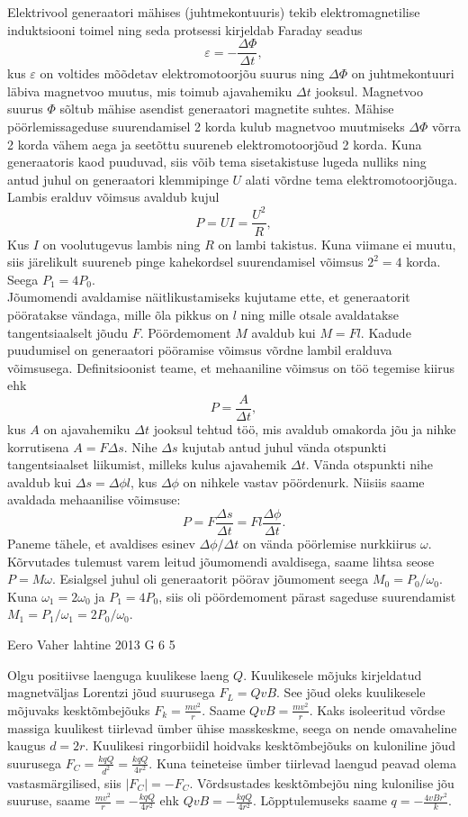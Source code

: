 \documentclass[11pt, twoside]{article}
\begin{document}
{{\ifSolution
\osa Elektrivool generaatori mähises (juhtmekontuuris) tekib elektromagnetilise induktsiooni toimel ning seda protsessi kirjeldab Faraday seadus
$$
\varepsilon = -\frac{\Delta\Phi}{\Delta t},
$$
kus $\varepsilon$ on voltides mõõdetav elektromotoorjõu suurus ning $\Delta\Phi$ on juhtmekontuuri läbiva magnetvoo muutus, mis toimub ajavahemiku $\Delta t$ jooksul. Magnetvoo suurus $\Phi$ sõltub mähise asendist generaatori magnetite suhtes. Mähise pöörlemissageduse suurendamisel 2 korda kulub magnetvoo muutmiseks $\Delta\Phi$ võrra 2 korda vähem aega  ja seetõttu suureneb elektromotoorjõud 2 korda. Kuna generaatoris kaod puuduvad, siis võib tema sisetakistuse lugeda nulliks ning antud juhul on generaatori klemmipinge $U$ alati võrdne tema elektromotoorjõuga. Lambis eralduv võimsus avaldub kujul
$$
P = UI = \frac{U^2}{R},
$$
Kus $I$ on voolutugevus lambis ning $R$ on lambi takistus. Kuna viimane ei muutu, siis järelikult suureneb pinge kahekordsel suurendamisel võimsus $2^2=4$ korda. Seega $P_1=4P_0$.\\
\osa Jõumomendi avaldamise näitlikustamiseks kujutame ette, et generaatorit pööratakse vändaga, mille õla pikkus on $l$ ning mille otsale avaldatakse tangentsiaalselt jõudu $F$. Pöördemoment $M$ avaldub kui $M=Fl$. Kadude puudumisel on generaatori pööramise võimsus võrdne lambil eralduva võimsusega. Definitsioonist teame, et mehaaniline võimsus on töö tegemise kiirus ehk
$$
P = \frac{A}{\Delta t},
$$
kus $A$ on ajavahemiku $\Delta t$ jooksul tehtud töö, mis avaldub omakorda jõu ja nihke korrutisena $A=F \Delta s$. Nihe $\Delta s$ kujutab antud juhul vända otspunkti tangentsiaalset liikumist, milleks kulus ajavahemik $\Delta t$. Vända otspunkti nihe avaldub kui $\Delta s=\Delta\phi l$, kus $\Delta\phi$ on nihkele vastav pöördenurk. Niisiis saame avaldada mehaanilise võimsuse:
$$
P = F \frac{\Delta s}{\Delta t} =Fl \frac{\Delta\phi}{\Delta t}.
$$
Paneme tähele, et avaldises esinev $\Delta\phi / \Delta t$ on vända pöörlemise nurkkiirus $\omega$. Kõrvutades tulemust varem leitud jõumomendi avaldisega, saame lihtsa seose $P=M\omega$. Esialgsel juhul oli generaatorit pöörav jõumoment seega
$M_0 = P_0/\omega_0$. Kuna $\omega_1=2\omega_0$ ja $P_1=4P_0$, siis oli pöördemoment pärast sageduse suurendamist $M_1 = P_1/\omega_1=2P_0/\omega_0$.
\fi
}

{Eero Vaher} %
{lahtine} %
{2013} %
{G 6} %
{5} %
{

\ifSolution
Olgu positiivse laenguga kuulikese laeng $Q$. Kuulikesele mõjuks kirjeldatud magnetväljas Lorentzi jõud suurusega $F_L=QvB$. See jõud oleks kuulikesele mõjuvaks kesktõmbejõuks $F_k=\frac{mv^2}{r}$. Saame $QvB=\frac{mv^2}{r}$. Kaks isoleeritud võrdse massiga kuulikest tiirlevad ümber ühise masskeskme, seega on nende omavaheline kaugus $d=2r$. Kuulikesi ringorbiidil hoidvaks kesktõmbejõuks on kuloniline jõud suurusega $F_C=\frac{kqQ}{d^2}=\frac{kqQ}{4r^2}$. Kuna teineteise ümber tiirlevad laengud peavad olema vastasmärgilised, siis $|F_C|=-F_C$. Võrdsustades kesktõmbejõu ning kulonilise jõu suuruse, saame $\frac{mv^2}{r}=-\frac{kqQ}{4r^2}$ ehk $QvB=-\frac{kqQ}{4r^2}$. Lõpptulemuseks saame $q=-\frac{4vBr^2}{k}$.
\fi
}

}
\end{document}
